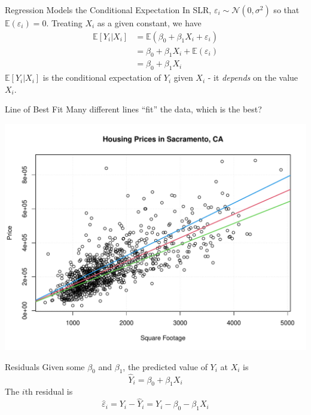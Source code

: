 \documentclass[handout]{beamer}
\begin{document}
\begin{frame}{Regression Models the Conditional Expectation}
    In SLR, $\varepsilon_i \sim \mathcal{N}(0, \sigma^2)$ so that $\mathbb{E}(\varepsilon_i) = 0$. Treating $X_i$ as a given constant, we have  
    \begin{equation*}
        \begin{split}
            \mathbb{E}[Y_i | X_i] &= \mathbb{E}(\beta_0 + \beta_1 X_i + \varepsilon_i) \\
            &= \beta_0 + \beta_1 X_i + \mathbb{E}(\varepsilon_i) \\
            &= \beta_0 + \beta_1 X_i
        \end{split}
    \end{equation*}
    $\mathbb{E}[Y_i | X_i]$ is the conditional expectation of $Y_i$ given $X_i$ - it \textit{depends} on the value $X_i$. 
\end{frame}

\begin{frame}{Line of Best Fit}
    Many different lines ``fit'' the data, which is the best?
    \begin{center}
        \includegraphics[width=.9\linewidth]{figures/sacramento_lines.pdf}
    \end{center}
\end{frame}

\begin{frame}{Residuals}
    Given some $\beta_0$ and $\beta_1$, the predicted value of $Y_i$ at $X_i$ is 
    \begin{equation*}
        \hat{Y}_i = \beta_0 + \beta_1 X_i
    \end{equation*}
    The $i$th residual is 
    \begin{equation*}
        \hat{\varepsilon}_i = Y_i - \hat{Y}_i = Y_i - \beta_0 - \beta_1 X_i
    \end{equation*}
\end{frame}
\end{document}
